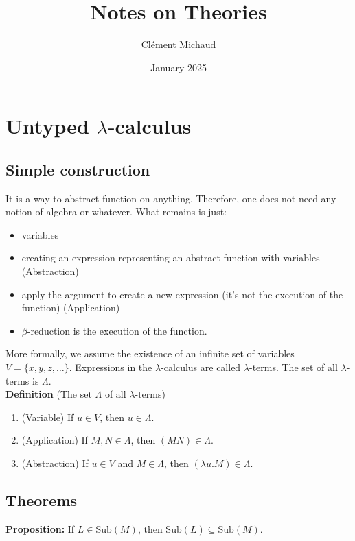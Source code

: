 \documentclass{article}
\title{Notes on Theories}
\author{Clément Michaud}
\date{January 2025}
\newcommand{\bred}{$\beta$-reduction\xspace}
\newcommand{\lcalc}{$\lambda$-calculus\xspace}
\newcommand{\lterms}{$\lambda$-terms\xspace}
\begin{document}
\maketitle

\section{Untyped \lcalc}

\subsection{Simple construction}

It is a way to abstract function on anything. Therefore, one does not need any notion of algebra or whatever. What remains is just:

\begin{itemize}
    \item variables
    \item creating an expression representing an abstract function with variables (Abstraction)
    \item apply the argument to create a new expression (it’s not the execution of the function) (Application)
    \item \bred is the execution of the function.

\end{itemize}

More formally, we assume the existence of an infinite set of variables $V=\{x, y, z, \dots\}$. Expressions in the \lcalc are called \lterms. The set of all \lterms is $\Lambda$.\\

\textbf{Definition} (The set $\Lambda$ of all $\lambda$-terms)
\begin{enumerate}
    \item (Variable) If $u \in V$, then $u \in \Lambda$.
    \item (Application) If $M, N \in \Lambda$, then $(MN) \in \Lambda$.
    \item (Abstraction) If $u \in V$ and $M \in \Lambda$, then $(\lambda u . M) \in \Lambda$.
\end{enumerate}

\subsection{Theorems}

\noindent \textbf{Proposition:} If $L \in \text{Sub}(M)$, then $\text{Sub}(L) \subseteq \text{Sub}(M)$.
\end{document}
